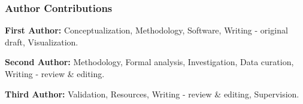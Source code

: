 \documentclass[runningheads]{llncs}
\begin{document}
\begin{credits}
\subsubsection{Author Contributions}

\textbf{First Author:} Conceptualization, Methodology, Software, Writing - original draft, Visualization.

\textbf{Second Author:} Methodology, Formal analysis, Investigation, Data curation, Writing - review \& editing.

\textbf{Third Author:} Validation, Resources, Writing - review \& editing, Supervision.


\end{credits}
%
%
%


%
\end{document}
